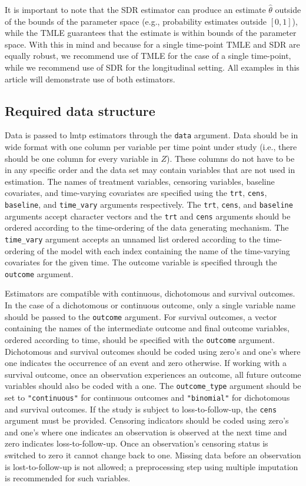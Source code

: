 \documentclass[twoside,11pt]{article}
\newcommand{\pkg}[1]{{\fontseries{b}\selectfont #1}}
\let\code=\texttt
\begin{document}
It is important to note that the SDR estimator can produce an estimate $\hat{\theta}$ outside of the bounds of the parameter space (e.g., probability estimates outside $[0,1]$), while the TMLE guarantees that the estimate is within bounds of the parameter space. With this in mind and because for a single time-point TMLE and SDR are equally robust, we recommend use of TMLE for the case of a single time-point, while we recommend use of SDR for the longitudinal setting. All examples in this article will demonstrate use of both estimators.

\hypertarget{required-data-structure}{\subsection{Required data structure}\label{required-data-structure}}

Data is passed to \pkg{lmtp} estimators through the \code{data} argument. Data should be in wide format with one column per variable per time point under study (i.e., there should be one column for every variable in $Z$). These columns do not have to be in any specific order and the data set may contain variables that are not used in estimation. The names of treatment variables, censoring variables, baseline covariates, and time-varying covariates are specified using the \code{trt}, \code{cens}, \code{baseline}, and \code{time\_vary} arguments respectively. The \code{trt}, \code{cens}, and \code{baseline} arguments accept character vectors and the \code{trt} and \code{cens} arguments should be ordered according to the time-ordering of the data generating mechanism. The \code{time\_vary} argument accepts an unnamed list ordered according to the time-ordering of the model with each index containing the name of the time-varying covariates for the given time. The outcome variable is specified through the \code{outcome} argument.

Estimators are compatible with continuous, dichotomous and survival outcomes. In the case of a dichotomous or continuous outcome, only a single variable name should be passed to the \code{outcome} argument. For survival outcomes, a vector containing the names of the intermediate outcome and final outcome variables, ordered according to time, should be specified with the \code{outcome} argument. Dichotomous and survival outcomes should be coded using zero's and one's where one indicates the occurrence of an event and zero otherwise. If working with a survival outcome, once an observation experiences an outcome, all future outcome variables should also be coded with a one. The \code{outcome\_type} argument should be set to \code{"continuous"} for continuous outcomes and \code{"binomial"} for dichotomous and survival outcomes. If the study is subject to loss-to-follow-up, the \code{cens} argument must be provided. Censoring indicators should be coded using zero's and one's where one indicates an observation is observed at the next time and zero indicates loss-to-follow-up. Once an observation's censoring status is switched to zero it cannot change back to one. Missing data before an observation is lost-to-follow-up is not allowed; a preprocessing step using multiple imputation is recommended for such variables.
\end{document}
